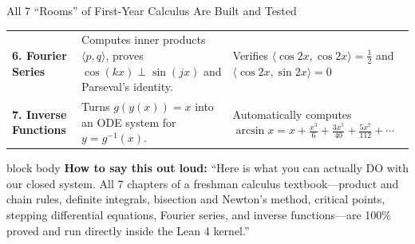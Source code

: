 \documentclass[aspectratio=169,11pt]{beamer}
\newcommand{\say}[1]{%
  \vfill
  \begin{beamercolorbox}[sep=5pt,rounded=true,shadow=false]{block body}
  {\footnotesize \textbf{\textcolor{deepblue}{How to say this out loud:}} ``#1''}
  \end{beamercolorbox}
}
\begin{document}
\begin{frame}[shrink=12]{All 7 ``Rooms'' of First-Year Calculus Are Built and Tested}
\begin{table}
\begin{tabular}{>{\bfseries}p{2.9cm} p{5.2cm} p{5.0cm}}
      6. Fourier Series & Computes inner products $\langle p, q \rangle$, proves $\cos(kx) \perp \sin(jx)$ and Parseval's identity. & Verifies $\langle \cos 2x, \cos 2x \rangle = \frac{1}{2}$ and $\langle \cos 2x, \sin 2x \rangle = 0$ \\
      7. Inverse Functions & Turns $g(y(x)) = x$ into an ODE system for $y = g^{-1}(x)$. & Automatically computes $\arcsin x = x + \frac{x^3}{6} + \frac{3x^5}{40} + \frac{5x^7}{112} + \cdots$ \\
      \bottomrule
    \end{tabular}
  \end{table}

  \say{Here is what you can actually DO with our closed system. All 7 chapters of a freshman calculus textbook---product and chain rules, definite integrals, bisection and Newton's method, critical points, stepping differential equations, Fourier series, and inverse functions---are 100\% proved and run directly inside the Lean 4 kernel.}
\end{frame}
\end{document}
